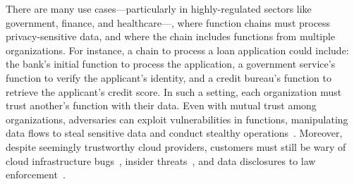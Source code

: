 %
There are many use cases---particularly in highly-regulated sectors like
government, finance, and healthcare---, where function chains must process
privacy-sensitive data, and where the chain includes functions from multiple
organizations.
%
For instance, a chain to process a loan application could include: 
the bank's initial function to process the application,  a
government service's function  to verify the applicant's identity, and
 a credit bureau's function to retrieve the applicant's credit
score.
%
In such a setting, each organization must trust another's function with their
data.
%
Even with mutual trust among organizations, adversaries can exploit
vulnerabilities in functions, manipulating data flows to steal sensitive data
and conduct stealthy operations~\cite{21-sec-sandtrap}.
%
%
Moreover, despite seemingly trustworthy  cloud providers, customers must still
be wary of cloud infrastructure bugs~\cite{14-socc-cloud_bugs}, insider
threats~\cite{09-hotcloud-trusted_cloud_computing}, and data disclosures to law
enforcement~\cite{ amazon-ring-videos-police, police-microsoft-personal-data,
police-phone-data-icloud}.



